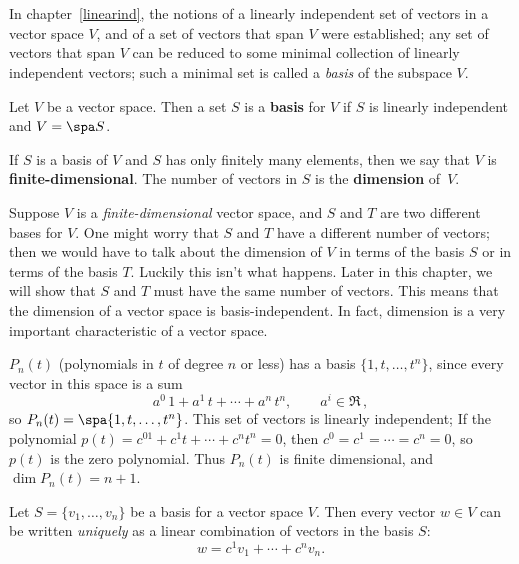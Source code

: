 \chapter{\basisDimTitle}\label{basisdimension}

\label{sec:dimension}
\label{dimension}
In chapter~\ref{linearind}, the notions of   a linearly independent set of vectors in a vector space $V$, and of a set of vectors that span $V$ were established; any set of vectors that span $V$ can be reduced to some minimal collection of linearly independent vectors; such a minimal set is called a \emph{basis} of the subspace $V$.  

\begin{definition}
Let $V$ be a vector space.  Then a set $S$ is a {\bf basis} for $V$ if $S$ is linearly independent and $V=\spa S$.


If $S$ is a basis of $V$ and $S$ has only finitely many elements, then we say that $V$ is {\bf finite-dimensional}.  The number of vectors in $S$ is the {\bf dimension} of~$V$.
\end{definition}

Suppose $V$ is a \emph{finite-dimensional} vector space, and $S$ and $T$ are two different bases for $V$.  One might worry that $S$ and $T$ have a different number of vectors; then we would have to talk about the dimension of $V$ in terms of the basis $S$ or in terms of the basis $T$.  Luckily this isn't what happens.
Later in this chapter, we will show that $S$ and $T$ must have the same number of vectors.  This means that the dimension of a vector space is basis-independent.  In fact, dimension is a very important  characteristic of a vector space.%

\begin{example}
$P_n(t)$ (polynomials in $t$ of degree $n$ or less) has a basis $\{1,t,\ldots , t^n \}$, since every vector in this space is a sum
\[
a^0\,1+a^1\,t+\cdots +a^n\,t^n, \qquad a^i\in \Re\, ,
\]
so $P_n(t)=\spa \{1,t,\ldots , t^n \}$.  This set of vectors is linearly independent;  If the polynomial $p(t)=c^01+c^1t+\cdots +c^nt^n=0$, then $c^0=c^1=\cdots =c^n=0$, so $p(t)$ is the zero polynomial.  
Thus $P_n(t)$ is finite dimensional, and $\dim P_n(t)=n+1$.
\end{example}



\begin{theorem}\label{uniqvec}
Let $S=\{v_1, \ldots, v_n \}$  be a basis for a vector space $V$.  Then every vector $w \in V$ can be written \emph{uniquely} as a linear combination of vectors in the basis $S$:
\[
w=c^1v_1+\cdots + c^nv_n.
\]
\end{theorem}

